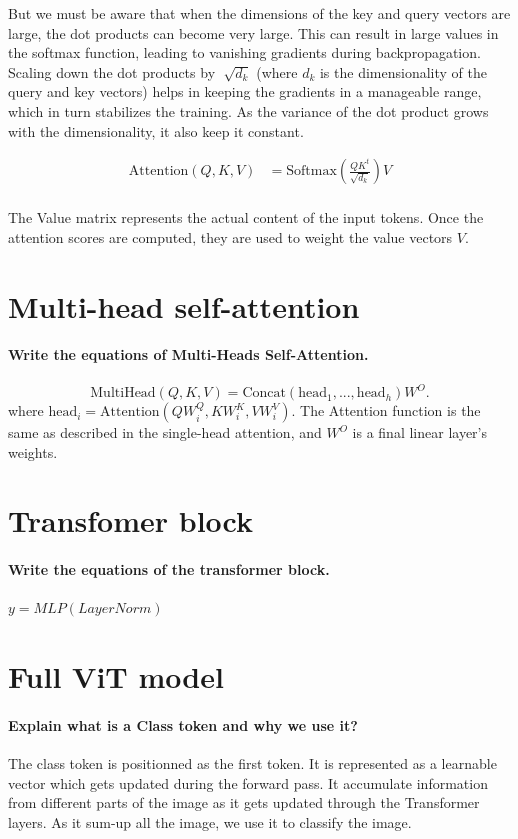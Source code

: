 But we must be aware that when the dimensions of the key and query vectors are large, the dot products can become very large. This can result in large values in the softmax function, leading to vanishing gradients during backpropagation. Scaling down the dot products by $ \sqrt[]{d_k} $ (where $ d_k $  is the dimensionality of the query and key vectors) helps in keeping the gradients in a manageable range, which in turn stabilizes the training. As the variance of the dot product grows with the dimensionality, it also keep it constant.

\begin{align*}
    \text{Attention}(Q, K, V) &= \text{Softmax}\left(\frac{QK^t}{\sqrt{d_k}}\right)V \\
\end{align*}

The Value matrix represents the actual content of the input tokens. Once the attention scores are computed, they are used to weight the value vectors $ V $.

\section{Multi-head self-attention}

\paragraph{Write the equations of Multi-Heads Self-Attention.}
\[
    \text{MultiHead}(Q, K, V) = \text{Concat}(\text{head}_1, ..., \text{head}_h)W^O
.\]
where $\text{head}_i = \text{Attention}(QW_i^Q, KW_i^K, VW_i^V)$. The Attention function is the same as described in the single-head attention, and $W^O$ is a final linear layer's weights.

\section{Transfomer block}

\paragraph{Write the equations of the transformer block.}
$y = MLP(LayerNorm)$

\section{Full ViT model}

\paragraph{Explain what is a Class token and why we use it?}
The class token is positionned as the first token. It is represented as a learnable vector which gets updated during the forward pass. It accumulate information from different parts of the image as it gets updated through the Transformer layers. As it sum-up all the image, we use it to classify the image.

